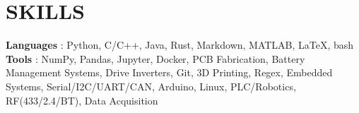 \section{SKILLS}
\begin{itemize}[leftmargin=0in, label={}]
    \small{\item{
                    \textbf{Languages} {: Python, C/C++, Java, Rust, Markdown, MATLAB, \LaTeX, bash}\vspace{2pt} \\
                    \textbf{Tools}     {: NumPy, Pandas, Jupyter, Docker, PCB Fabrication, Battery Management Systems, Drive Inverters, Git, 3D Printing, Regex, Embedded Systems, Serial/I2C/UART/CAN, Arduino, Linux, PLC/Robotics, RF(433/2.4/BT), Data Acquisition}
              }}
\end{itemize}